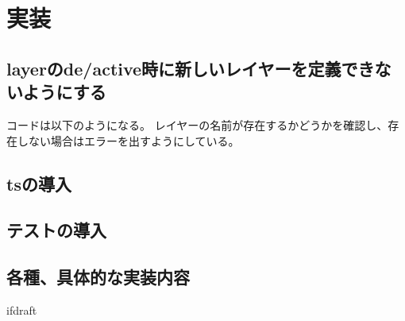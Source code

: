 \documentclass{jsarticle}
\begin{document}
    \fi
    \section{実装}

    \subsection{layerのde/active時に新しいレイヤーを定義できないようにする}
    コードは以下のようになる。
    レイヤーの名前が存在するかどうかを確認し、存在しない場合はエラーを出すようにしている。

    \subsection{tsの導入}
    \subsection{テストの導入}
    \subsection{各種、具体的な実装内容}

    \expandafter\ifx\csname ifdraft\endcsname\relax
\end{document}
